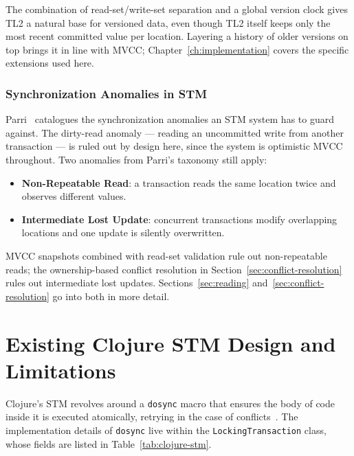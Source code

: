 The combination of read-set/write-set separation and a global version clock
gives TL2 a natural base for versioned data, even though TL2 itself keeps
only the most recent committed value per location. Layering a history of
older versions on top brings it in line with MVCC; Chapter~\ref{ch:implementation}
covers the specific extensions used here.

\subsubsection{Synchronization Anomalies in STM}

Parri~\cite{parriTmIntro} catalogues the synchronization anomalies an STM
system has to guard against. The dirty-read anomaly — reading an uncommitted
write from another transaction — is ruled out by design here, since the system
is optimistic MVCC throughout. Two anomalies from Parri's taxonomy
still apply:

\begin{itemize}
  \item \textbf{Non-Repeatable Read}: a transaction reads the same location
        twice and observes different values.
  \item \textbf{Intermediate Lost Update}: concurrent transactions modify
        overlapping locations and one update is silently overwritten.
\end{itemize}

MVCC snapshots combined with read-set validation rule out non-repeatable
reads; the ownership-based conflict resolution in
Section~\ref{sec:conflict-resolution} rules out intermediate lost updates.
Sections~\ref{sec:reading} and~\ref{sec:conflict-resolution} go into both in
more detail.

\section{Existing Clojure STM Design and Limitations}

Clojure's STM revolves around a \texttt{dosync} macro that ensures the body
of code inside it is executed atomically, retrying in the case of
conflicts~\cite{clojureRefs}. The implementation details of \texttt{dosync}
live within the \texttt{LockingTransaction} class, whose fields are listed
in Table~\ref{tab:clojure-stm}.

